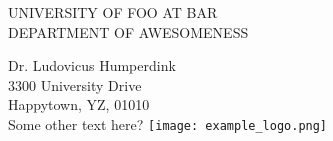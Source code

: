 \documentclass[letterpaper,12pt]{article}
\begin{document}
\begin{flushleft}
    {\Large\scshape UNIVERSITY OF FOO AT BAR }\\
    \vspace*{0.06in}
    {\scshape DEPARTMENT OF AWESOMENESS }
\end{flushleft}

\setlength{\columnsep}{0.5in}
\setcolumnwidth{4.5in, 1in}

\begin{paracol}{2}
    \vspace*{0.05in} %
    \onehalfspacing
    \noindent Dr. Ludovicus Humperdink \\
    3300 University Drive \\
    Happytown, YZ, 01010 \\
    Some other text here?
    \switchcolumn
    \vspace*{-1in}\hspace*{-0.8in}\texttt{[image: example\_logo.png]}
\end{paracol}
\vspace*{-0.5in}
\noindent\textcolor{longline}{\makebox[\linewidth]{\rule{\textwidth}{0.8pt}}}
\vspace*{0.5in}
\end{document}
